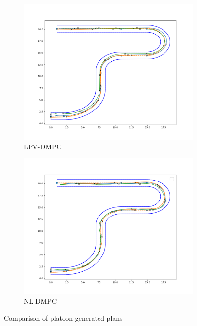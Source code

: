 \documentclass[a4paper,fleqn]{cas-sc}
\begin{document}
\begin{figure}
    \centering
        \begin{subfigure}{0.5\textwidth}
          \centering
          \includegraphics[width=\textwidth]{figs/experiments/track_LPV.png}
          \caption{LPV-DMPC}
          \label{fig:figPlane}
        \end{subfigure}%
        \begin{subfigure}{.5\textwidth}
          \centering
          \includegraphics[width=\textwidth]{figs/experiments/track_NL.png}
          \caption{NL-DMPC}
          \label{fig:figEuclidean}
        \end{subfigure}
    \caption{Comparison of platoon generated plans}
    \label{fig:GeneratedPlans}
\end{figure}
\end{document}
